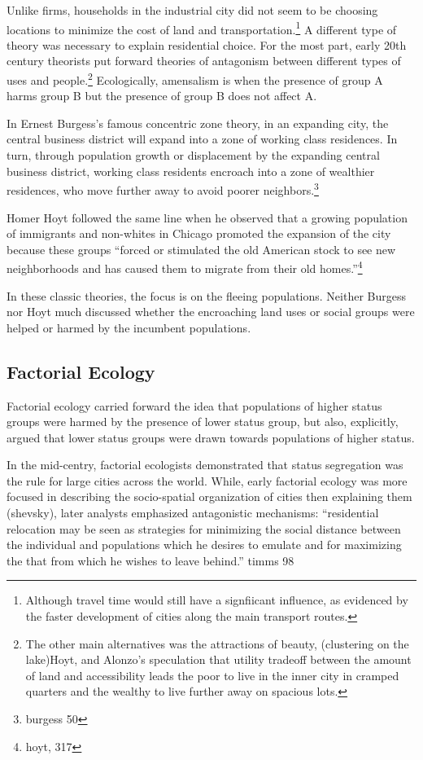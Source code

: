 Unlike firms, households in the industrial city did not seem to be
choosing locations to minimize the cost of land and
transportation.\footnote{Although travel time would still have a
  signfiicant influence, as evidenced by the faster development of
  cities along the main transport routes.} A different type of theory
was necessary to explain residential choice. For the most part,
early 20th century theorists put forward theories of antagonism
between different types of uses and people.\footnote{The other main
  alternatives was the attractions of beauty, (clustering on the
  lake)Hoyt, and Alonzo's speculation that utility tradeoff between
  the amount of land and accessibility leads the poor to live in the
  inner city in cramped quarters and the wealthy to live further away
  on spacious lots.} Ecologically, amensalism is when the presence of
group A harms group B but the presence of group B does not affect A.

In Ernest Burgess's famous concentric zone theory, in an expanding
city, the central business district will expand into a zone of working
class residences. In turn, through population growth or displacement by the
expanding central business district, working class residents encroach 
into a zone of wealthier residences, who move further away to avoid
poorer neighbors.\footnote{burgess 50}

Homer Hoyt followed the same line when he observed that a growing
population of immigrants and non-whites in Chicago promoted the
expansion of the city because these groups ``forced or stimulated the
old American stock to see new neighborhoods and has caused them to
migrate from their old homes.''\footnote{hoyt, 317}

In these classic theories, the focus is on the fleeing populations.
Neither Burgess nor Hoyt much discussed whether the encroaching land
uses or social groups were helped or harmed by the incumbent
populations.

\subsection*{Factorial Ecology}
Factorial ecology carried forward the idea that populations of higher
status groups were harmed by the presence of lower status group, but
also, explicitly, argued that lower status groups were drawn towards
populations of higher status.

In the mid-centry, factorial ecologists demonstrated that status
segregation was the rule for large cities across the world. While,
early factorial ecology was more focused in describing the
socio-spatial organization of cities then explaining them (shevsky),
later analysts emphasized antagonistic mechanisms: ``residential
relocation may be seen as strategies for minimizing the social
distance between the individual and populations which he desires to
emulate and for maximizing the that from which he wishes to leave
behind.'' timms 98

